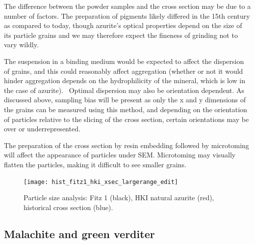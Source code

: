The difference between the powder samples and the cross section may be due to a number of factors. The preparation of pigments likely differed in the 15th century as compared to today, though azurite's optical properties depend on the size of its particle grains and we may therefore expect the fineness of grinding not to vary wildly. 

The suspension in a binding medium would be expected to affect the dispersion of grains, and this could reasonably affect aggregation (whether or not it would hinder aggregation depends on the hydrophilicity of the mineral, which is low in the case of azurite).~\autocite{Zhang} Optimal dispersion may also be orientation dependent. As discussed above, sampling bias will be present as only the x and y dimensions of the grains can be measured using this method, and depending on the orientation of particles relative to the slicing of the cross section, certain orientations may be over or underrepresented. 

The preparation of the cross section by resin embedding followed by microtoming will affect the appearance of particles under SEM. Microtoming may visually flatten the particles, making it difficult to see smaller grains. 

\begin{figure}[H]
\centering
  \texttt{[image: hist\_fitz1\_hki\_xsec\_largerange\_edit]}
\caption[Particle size analysis: HKI natural azurite, Fitz 1, historical cross section]{Particle size analysis: Fitz 1 (black), HKI natural azurite (red), historical cross section (blue).} 
\label{fig:hist_all}
\end{figure}




\subsection[Malachite and green verditer]{Malachite and green verditer}
\label{subsection3.1.2}

